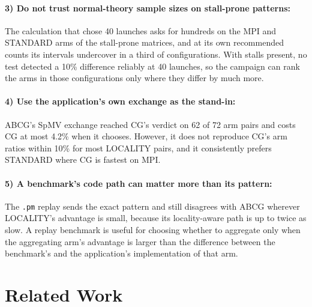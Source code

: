 \documentclass[11pt]{article}
\newcommand{\pmrep}{\texttt{.pm} replay}
\begin{document}
\paragraph{3) Do not trust normal-theory sample sizes on stall-prone patterns:} The
calculation that chose 40 launches asks for hundreds on the MPI and STANDARD arms of the
stall-prone matrices, and at its own recommended counts its intervals undercover in a
third of configurations. With stalls present, no test detected a 10\% difference reliably
at 40 launches, so the campaign can rank the arms in those configurations only where they
differ by much more.

\paragraph{4) Use the application's own exchange as the stand-in:} ABCG's SpMV exchange
reached CG's verdict on 62 of 72 arm pairs and costs CG at most 4.2\% when it chooses.
However, it does not reproduce CG's arm ratios within 10\% for most LOCALITY pairs, and it
consistently prefers STANDARD where CG is fastest on MPI.

\paragraph{5) A benchmark's code path can matter more than its pattern:} The \pmrep{} sends
the exact pattern and still disagrees with ABCG wherever LOCALITY's advantage is small,
because its locality-aware path is up to twice as slow. A replay benchmark is useful for
choosing whether to aggregate only when the aggregating arm's advantage is larger than the
difference between the benchmark's and the application's implementation of that arm.

\section{Related Work}
\label{sec:related}
\end{document}
